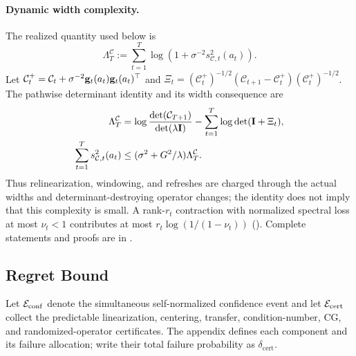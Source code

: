 \documentclass[twoside]{article}
\newcommand{\Calg}{\mathcal{C}}                 %
\newcommand{\Lamalg}{\Lambda^{\Calg}}           %
\begin{document}
\paragraph{Dynamic width complexity.}
The realized quantity used below is
\begin{equation}\label{eq:main-lambda}
 \Lamalg_T:=\sum_{t=1}^T\log\!\left(1+\sigma^{-2}s_{\Calg,t}^2(a_t)\right).
\end{equation}
Let $\Calg_t^+=\Calg_t+\sigma^{-2}\bg_t(a_t)\bg_t(a_t)^\top$ and
$\Xi_t=(\Calg_t^+)^{-1/2}(\Calg_{t+1}-\Calg_t^+)(\Calg_t^+)^{-1/2}$.
The pathwise determinant identity and its width consequence are
\begin{equation}\label{eq:main-dynamic}
\begin{aligned}
 \Lamalg_T&=\log\frac{\det(\Calg_{T+1})}{\det(\lambda\bI)}
 -\sum_{t=1}^T\log\det(\bI+\Xi_t),\\
 \sum_{t=1}^T s_{\Calg,t}^2(a_t)
 &\le(\sigma^2+G^2/\lambda)\Lamalg_T.
\end{aligned}
\end{equation}
Thus relinearization, windowing, and refreshes are charged through the actual
widths and determinant-destroying operator changes; the identity does not imply
that this complexity is small.  A rank-$r_t$ contraction with normalized spectral
loss at most $\nu_t<1$ contributes at most
$r_t\log(1/(1-\nu_t))$ ().  Complete statements and proofs are in
.

\subsection{Regret Bound}

Let $\mathcal{E}_{\mathrm{conf}}$ denote the simultaneous self-normalized confidence
event and let $\mathcal{E}_{\mathrm{cert}}$ collect the predictable linearization,
centering, transfer, condition-number, CG, and randomized-operator certificates.
The appendix defines each component and its failure allocation; write their
total failure probability as $\delta_{\mathrm{cert}}$.
\end{document}

